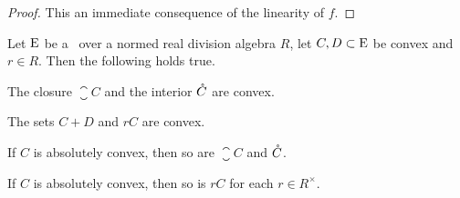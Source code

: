 \begin{proof}
  This an immediate consequence of the linearity of $f$.
\end{proof}

\begin{lemma}
\label{thm:closure-interior-convex-set-convex}
  Let $\mathrm{E}$ be a \tvs~over a normed real division algebra $R$, let $C,D \subset \mathrm{E}$ be convex 
  and $r \in R$. Then the following holds true.
  \begin{romanlist}
  \item\label{ite:closure-interior-convex-set-convex}
    The closure $\closure{C}$ and the interior $\mathring{C}$ are convex.
  \item\label{ite:sum-multiple-convex-set-convex}
    The sets $C + D$ and $rC$ are convex.
  \item
    If $C$ is absolutely convex, then so are $\closure{C}$  and $\mathring{C}$.
  \item
    If $C$ is absolutely convex, then so is $rC$ for each $r \in R^\times$. 
  \end{romanlist} 
\end{lemma}

